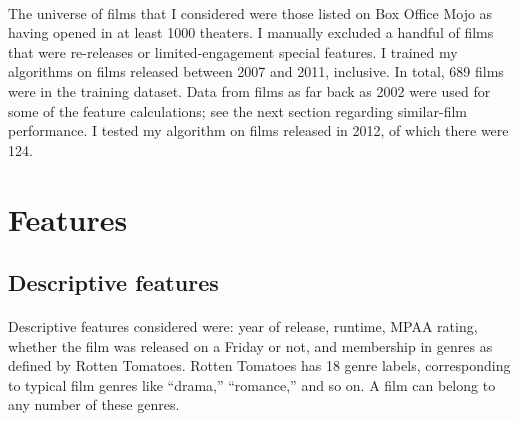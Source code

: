 \documentclass[10pt]{article}
\begin{document}
    \paragraph{}
    The universe of films that I considered were those listed on Box Office Mojo as having opened in at least 1000 theaters. I manually excluded a handful of films that were re-releases or limited-engagement special features. I trained my algorithms on films released between 2007 and 2011, inclusive. In total, 689 films were in the training dataset. Data from films as far back as 2002 were used for some of the feature calculations; see the next section regarding similar-film performance. I tested my algorithm on films released in 2012, of which there were 124. 
    
    \section{Features}
    
    \subsection{Descriptive features}
    
    \paragraph{}
    Descriptive features considered were: year of release, runtime, MPAA rating, whether the film was released on a Friday or not, and membership in genres as defined by Rotten Tomatoes. Rotten Tomatoes has 18 genre labels, corresponding to typical film genres like ``drama,'' ``romance,'' and so on. A film can belong to any number of these genres. 
    
\end{document}
